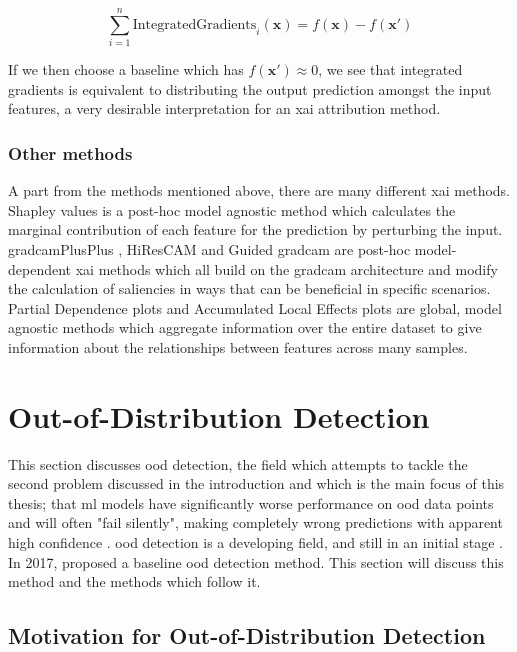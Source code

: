 \documentclass[UKenglish]{uiomasterthesis} %
\theoremstyle{definition}
\begin{document}
\begin{equation}
    \sum_{i=1}^n \text{IntegratedGradients}_i(\mathbf{x}) = f(\mathbf{x}) - f(\mathbf{x'})
\end{equation}

If we then choose a baseline which has $f(\mathbf{x'}) \approx 0$, we see that integrated gradients is equivalent to distributing the output prediction amongst the input features, a very desirable interpretation for an \ac{xai} attribution method.

\subsubsection{Other methods}

A part from the methods mentioned above, there are many different \ac{xai} methods. Shapley values \cite{shapley} is a post-hoc model agnostic method which calculates the marginal contribution of each feature for the prediction by perturbing the input. \ac{gradcam}PlusPlus \cite{gradcamplusplus}, HiResCAM \cite{hirescam} and Guided \ac{gradcam} \cite{gradcam} are post-hoc model-dependent \ac{xai} methods which all build on the \ac{gradcam} architecture and modify the calculation of saliencies in ways that can be beneficial in specific scenarios. Partial Dependence plots \cite{pdp} and Accumulated Local Effects plots \cite{ale} are global, model agnostic methods which aggregate information over the entire dataset to give information about the relationships between features across many samples. %


\section{Out-of-Distribution Detection} \label{ood_intro}

This section discusses \ac{ood} detection, the field which attempts to tackle the second problem discussed in the introduction and which is the main focus of this thesis; that \ac{ml} models have significantly worse performance on \ac{ood} data points and will often "fail silently", making completely wrong predictions with apparent high confidence \cite{adversarial}. \ac{ood} detection is a developing field, and still in an initial stage \cite{ooddl}. In 2017, \cite{oodbaseline} proposed a baseline \ac{ood} detection method. This section will discuss this method and the methods which follow it.

\subsection{Motivation for Out-of-Distribution Detection}
\end{document}
